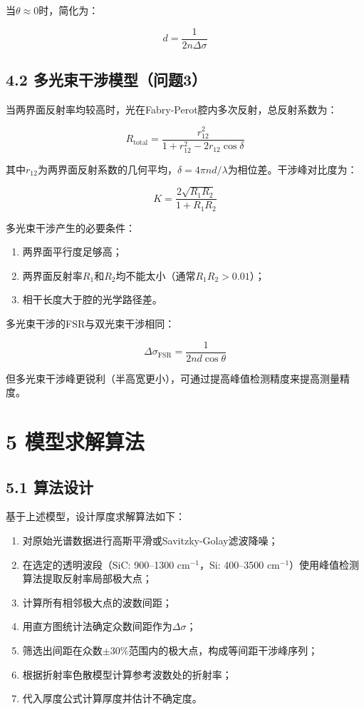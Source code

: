 \documentclass[12pt,a4paper]{article}
\begin{document}
当$\theta \approx 0$时，简化为：

\begin{equation}
d = \frac{1}{2n\Delta\sigma}
\end{equation}

\subsection{4.2 多光束干涉模型（问题3）}
当两界面反射率均较高时，光在Fabry-Perot腔内多次反射，总反射系数为：

\begin{equation}
R_{\text{total}} = \frac{r_{12}^2}{1 + r_{12}^2 - 2r_{12}\cos\delta}
\end{equation}

其中$r_{12}$为两界面反射系数的几何平均，$\delta=4\pi nd/\lambda$为相位差。干涉峰对比度为：

\begin{equation}
K = \frac{2\sqrt{R_1 R_2}}{1 + R_1 R_2}
\end{equation}

多光束干涉产生的必要条件：
\begin{enumerate}
\item 两界面平行度足够高；
\item 两界面反射率$R_1$和$R_2$均不能太小（通常$R_1 R_2 > 0.01$）；
\item 相干长度大于腔的光学路径差。
\end{enumerate}

多光束干涉的FSR与双光束干涉相同：

\begin{equation}
\Delta\sigma_{\text{FSR}} = \frac{1}{2nd\cos\theta}
\end{equation}

但多光束干涉峰更锐利（半高宽更小），可通过提高峰值检测精度来提高测量精度。

\section{5 模型求解算法}

\subsection{5.1 算法设计}
基于上述模型，设计厚度求解算法如下：

\begin{enumerate}
\item 对原始光谱数据进行高斯平滑或Savitzky-Golay滤波降噪；
\item 在选定的透明波段（SiC: 900--1300 cm$^{-1}$，Si: 400--3500 cm$^{-1}$）使用峰值检测算法提取反射率局部极大点；
\item 计算所有相邻极大点的波数间距；
\item 用直方图统计法确定众数间距作为$\Delta\sigma$；
\item 筛选出间距在众数$\pm30\%$范围内的极大点，构成等间距干涉峰序列；
\item 根据折射率色散模型计算参考波数处的折射率；
\item 代入厚度公式计算厚度并估计不确定度。
\end{enumerate}
\end{document}
